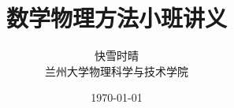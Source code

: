 \title{数学物理方法小班讲义}  %
\author{快雪时晴\\{兰州大学物理科学与技术学院}} %
\date{\today}                                   %

\maketitle %
